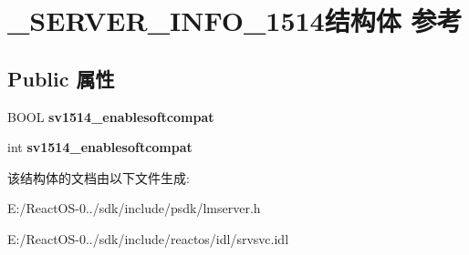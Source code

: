 \hypertarget{struct___s_e_r_v_e_r___i_n_f_o__1514}{}\section{\+\_\+\+S\+E\+R\+V\+E\+R\+\_\+\+I\+N\+F\+O\+\_\+1514结构体 参考}
\label{struct___s_e_r_v_e_r___i_n_f_o__1514}
\subsection*{Public 属性}
\begin{DoxyCompactItemize}
\item 
\mbox{\label{struct___s_e_r_v_e_r___i_n_f_o__1514_a84a23bda510c835c0e3ac04ef77fbf95}} 
B\+O\+OL {\bfseries sv1514\+\_\+enablesoftcompat}
\item 
\mbox{\label{struct___s_e_r_v_e_r___i_n_f_o__1514_a53fbadc77b15a8bd64c169d110d67a2b}} 
int {\bfseries sv1514\+\_\+enablesoftcompat}
\end{DoxyCompactItemize}


该结构体的文档由以下文件生成\+:\begin{DoxyCompactItemize}
\item 
E\+:/\+React\+O\+S-\/0../sdk/include/psdk/lmserver.\+h\item 
E\+:/\+React\+O\+S-\/0../sdk/include/reactos/idl/srvsvc.\+idl\end{DoxyCompactItemize}

